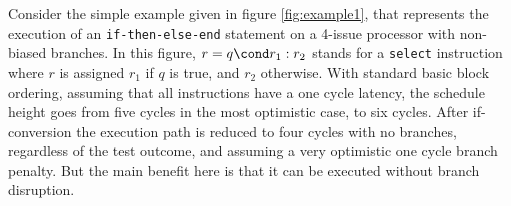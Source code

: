 Consider the simple example given in figure \ref{fig:example1}, that represents the execution of an \texttt{if-then-else-end} statement on a 4-issue processor with non-biased branches. In this figure, $r=q\cond r_1:r_2$ stands for a \texttt{select} instruction where $r$ is assigned $r_1$ if $q$ is true, and $r_2$ otherwise. With standard basic block ordering, assuming that all instructions have a one cycle latency, the schedule height goes from five cycles in the most optimistic case, to six cycles. After if-conversion the execution path is reduced to four cycles with no branches, regardless of the test outcome, and assuming a very optimistic one cycle branch penalty. But the main benefit here is that it can be executed without branch disruption. 

\begin{figure}


\end{figure}
